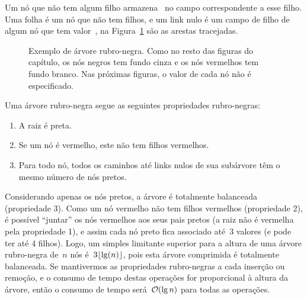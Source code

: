 \documentclass[../../main.tex]{subfiles}
\begin{document}
Um nó que não tem algum filho armazena~ no campo correspondente a esse filho. Uma folha é um nó que não tem filhos, e um link nulo é um campo de filho de algum nó que tem valor~, na Figura~\ref{fig:arv_bin_ex} são as arestas tracejadas.


\begin{figure}
\centering
{}
\caption{Exemplo de árvore rubro-negra. Como no resto das figuras do capítulo, os nós negros tem fundo cinza e os nós vermelhos tem fundo branco. Nas próximas figuras, o valor de cada nó não é especificado.} \label{fig:arv_bin_ex}
\end{figure}

Uma árvore rubro-negra segue as seguintes propriedades rubro-negras:
\begin{enumerate}
\item A raiz é preta.
\item Se um nó é vermelho, este não tem filhos vermelhos.
\item Para todo nó, todos os caminhos até links nulos de sua subárvore têm o mesmo número de nós pretos.
\end{enumerate}

Considerando apenas os nós pretos, a árvore é totalmente balanceada (propriedade 3). Como um nó vermelho não tem filhos vermelhos (propriedade 2), é possível ``juntar'' os nós vermelhos aos seus pais pretos (a raiz não é vermelha pela propriedade 1), e assim cada nó preto fica associado até~3 valores (e pode ter até 4 filhos). Logo, um simples limitante superior para a altura de uma árvore rubro-negra de~$n$ nós é~$3\lfloor\lg(n)\rfloor$, pois esta árvore comprimida é totalmente balanceada. Se mantivermos as propriedades rubro-negras a cada inserção ou remoção, e o consumo de tempo destas operações for proporcional à altura da árvore, então o consumo de tempo será~$\mathcal{O}(\lg n)$ para todas as operações.
\end{document}
